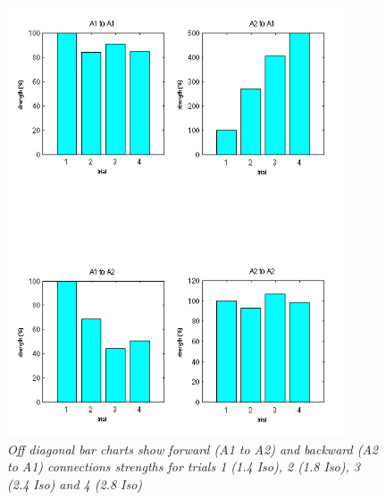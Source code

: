 \begin{figure}
\begin{center}
\includegraphics[width=100mm]{dcm_ssr/fig3}
\caption{\em Off diagonal bar charts show forward (A1 to A2) and backward (A2 to A1) connections strengths for trials 1 (1.4 Iso), 2 (1.8 Iso), 3 (2.4 Iso) and 4 (2.8 Iso) \label{dcm_ssr:fig3}}
\end{center}
\end{figure}
